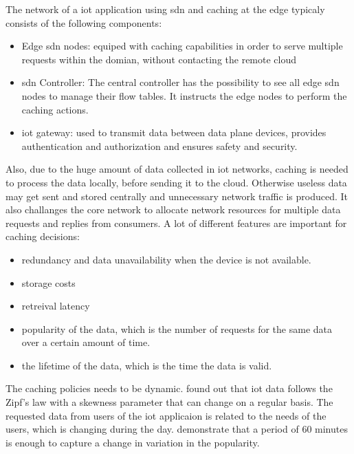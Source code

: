 \documentclass[conference]{IEEEtran}
\begin{document}
	The network of a \ac{iot} application using \ac{sdn} and caching at the edge typicaly consists of the following components:
	\begin{itemize}
		\item Edge \ac{sdn} nodes: equiped with caching capabilities in order to serve multiple requests within the domian, without contacting the remote cloud \cite{caching-1} \cite{caching-2}  
		\item \ac{sdn} Controller: The central controller has the possibility to see all edge \ac{sdn} nodes to manage their flow tables. It instructs the edge nodes to perform the caching actions. \cite{caching-1} \cite{caching-2}  
		\item \ac{iot} gateway: used to transmit data between data plane devices, provides authentication and authorization and ensures safety and security. \cite{caching-1}
	\end{itemize}

	Also, due to the huge amount of data collected in \ac{iot} networks, caching is needed to process the data locally, before sending it to the cloud. Otherwise useless data may get sent and stored centrally and unnecessary network traffic is produced. \cite{caching-1} It also challanges the core network to allocate network resources for multiple data requests and replies from consumers. \cite{caching-2}
	A lot of different features are important for caching decisions:

	\begin{itemize}
		\item redundancy and data unavailability when the device is not available. \cite{caching-1}
		\item storage costs
		\item retreival latency
		\item popularity of the data, which is the number of requests for the same data over a certain amount of time. \cite{caching-2}
		\item the lifetime of the data, which is the time the data is valid. \cite{caching-2}
	\end{itemize}

	The caching policies needs to be dynamic. \cite{caching-5} found out that \ac{iot} data follows the Zipf's law with a skewness parameter that can change on a regular basis. The requested data from users of the \ac{iot} applicaion is related to the needs of the users, which is changing during the day. \citeauthor{caching-5} demonstrate that a period of 60 minutes is enough to capture a change in variation in the popularity.  
\end{document}
